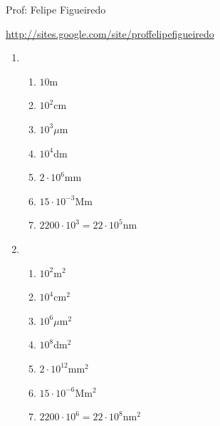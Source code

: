 \documentclass[a4paper]{article}
\begin{document}
\parbox[c]{.825\textwidth}{\raggedright%
{Prof: Felipe Figueiredo\par}
{\url{http://sites.google.com/site/proffelipefigueiredo}}

\vspace{1cm}
}


\begin{enumerate}
\item %
  \begin{enumerate}
  \item $10$m %
  \item $10^2$cm %
  \item $10^3\mu$m %
  \item $10^4$dm %
  \item $2\cdot 10^6$mm %
  \item $15\cdot 10^{-3}$Mm %
  \item $2200 \cdot 10^3 = 22 \cdot 10^5$nm %
  \end{enumerate}
\item %
  \begin{enumerate}
  \item $10^2$m$^2$ %
  \item $10^4$cm$^2$ %
  \item $10^6\mu$m$^2$ %
  \item $10^8$dm$^2$ %
  \item $2\cdot 10^{12}$mm$^2$ %
  \item $15\cdot 10^{-6}$Mm$^2$ %
  \item $2200 \cdot 10^6 = 22 \cdot 10^8$nm$^2$ %
  \end{enumerate}


\end{enumerate}
\end{document}
